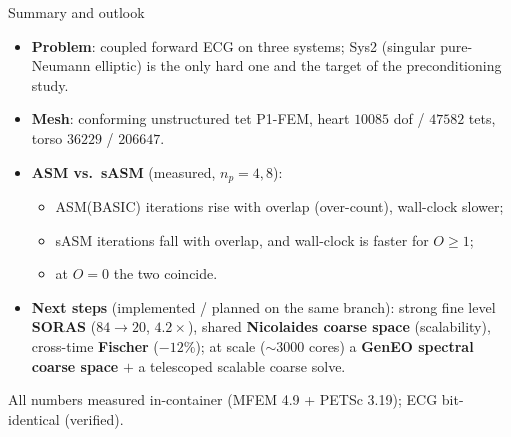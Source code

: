 \documentclass[aspectratio=169,11pt]{beamer}
\begin{document}
\begin{frame}{Summary and outlook}
\begin{itemize}
\item \textbf{Problem}: coupled forward ECG on three systems; Sys2 (singular pure-Neumann elliptic) is the only hard one and the target of the preconditioning study.
\item \textbf{Mesh}: conforming unstructured tet P1-FEM, heart $10085$ dof / $47582$ tets, torso $36229$ / $206647$.
\item \textbf{ASM vs.\ sASM} (measured, $n_p{=}4,8$):
  \begin{itemize}
  \item ASM(BASIC) iterations \textcolor{bad}{rise with overlap} (over-count), wall-clock slower;
  \item sASM iterations \textcolor{good}{fall with overlap}, and wall-clock is faster for $O{\ge}1$;
  \item at $O{=}0$ the two coincide.
  \end{itemize}
\item \textbf{Next steps} (implemented / planned on the same branch): strong fine level \textbf{SORAS} ($84{\to}20$, $4.2\times$), shared \textbf{Nicolaides coarse space} (scalability), cross-time \textbf{Fischer} ($-12\%$); at scale ($\sim$3000 cores) a \textbf{GenEO spectral coarse space} $+$ a telescoped scalable coarse solve.
\end{itemize}
\vspace{0.4em}
\centering\footnotesize All numbers measured in-container (MFEM 4.9 + PETSc 3.19); ECG bit-identical (verified).
\end{frame}
\end{document}
